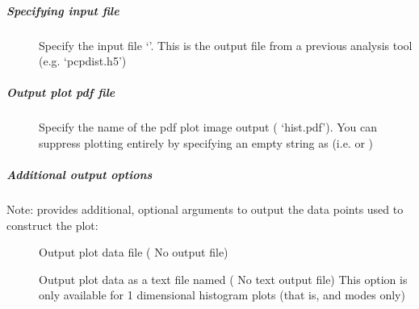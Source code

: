 \documentclass[letterpaper,10pt,english]{sphinxmanual}
\begin{document}
\subparagraph{Specifying input file}
\label{\detokenize{users_guide/command_line_tools/plothist:specifying-input-file}}\begin{description}
\item[{}] \leavevmode
Specify the input  file ‘’. This is the output file
from a previous analysis tool (e.g. ‘pcpdist.h5’)

\end{description}


\subparagraph{Output plot pdf file}
\label{\detokenize{users_guide/command_line_tools/plothist:output-plot-pdf-file}}\begin{description}
\item[{}] \leavevmode
Specify the name of the pdf plot image output (
‘hist.pdf’).
 You can suppress plotting entirely by specifying an empty string
as  (i.e.  or )

\end{description}


\subparagraph{Additional output options}
\label{\detokenize{users_guide/command_line_tools/plothist:additional-output-options}}
Note:  provides additional, optional arguments to output the
data points used to construct the plot:
\begin{description}
\item[{}] \leavevmode
Output plot data  file  ( No
 output file)

\item[{}] \leavevmode
Output plot data as a text file named 
( No text output file)
 This option is only available for 1 dimensional histogram
plots (that is,  and  modes only)

\end{description}
\end{document}
